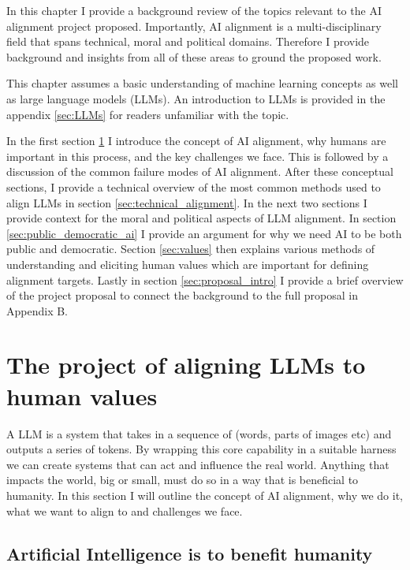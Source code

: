 In this chapter I provide a background review of the topics relevant to the AI alignment project proposed. Importantly, AI alignment is a multi-disciplinary field that spans technical, moral and political domains. Therefore I provide background and insights from all of these areas to ground the proposed work.

This chapter assumes a basic understanding of machine learning concepts as well as large language models (LLMs). An introduction to LLMs is provided in the appendix \ref{sec:LLMs} for readers unfamiliar with the topic.

In the first section \ref{sec:alignment} I introduce the concept of AI alignment, why humans are important in this process, and the key challenges we face. This is followed by a discussion of the common failure modes of AI alignment. After these conceptual sections, I provide a technical overview of the most common methods used to align LLMs in section \ref{sec:technical_alignment}. In the next two sections I provide context for the moral and political aspects of LLM alignment. In section \ref{sec:public_democratic_ai} I provide an argument for why we need AI to be both public and democratic. Section \ref{sec:values} then explains various methods of understanding and eliciting human values which are important for defining alignment targets. Lastly in section \ref{sec:proposal_intro} I provide a brief overview of the project proposal to connect the background to the full proposal in Appendix B.

\section{The project of aligning LLMs to human values}
\label{sec:alignment}

A LLM is a system that takes in a sequence of  (words, parts of images etc) and outputs a series of tokens. By wrapping this core capability in a suitable harness we can create systems that can act and influence the real world. Anything that impacts the world, big or small, must do so in a way that is beneficial to humanity. In this section I will outline the concept of AI alignment, why we do it, what we want to align to and challenges we face.

\subsection{Artificial Intelligence is to benefit humanity}

